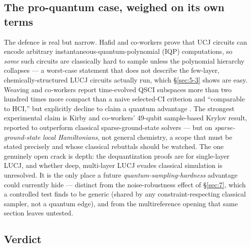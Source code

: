 \documentclass[11pt]{article}
\begin{document}
\subsection{The pro-quantum case, weighed on its own terms}\label{sec:5-4}

The defence is real but narrow. Hafid and co-workers prove that UCJ circuits can encode arbitrary instantaneous-quantum-polynomial (IQP) computations, so \emph{some} such circuits are classically hard to sample unless the polynomial hierarchy collapses \cite{hafid2025} --- a worst-case statement that does not describe the few-layer, chemically-structured LUCJ circuits actually run, which \S\ref{sec:5-3} shows are easy. Weaving and co-workers report time-evolved QSCI subspaces more than two hundred times more compact than a naive selected-CI criterion and ``comparable to HCI,'' but explicitly decline to claim a quantum advantage \cite{weaving2025}. The strongest experimental claim is Kirby and co-workers' 49-qubit sample-based Krylov result, reported to outperform classical sparse-ground-state solvers \cite{kirby2026} --- but on \emph{sparse-ground-state local Hamiltonians}, not general chemistry, a scope that must be stated precisely and whose classical rebuttals should be watched. The one genuinely open crack is depth: the dequantization proofs are for single-layer LUCJ, and whether deep, multi-layer LUCJ evades classical simulation is unresolved. It is the only place a future \emph{quantum-sampling-hardness} advantage could currently hide --- distinct from the noise-robustness effect of \S\ref{sec:7}, which a controlled test finds to be generic (shared by any constraint-respecting classical sampler, not a quantum edge), and from the multireference opening that same section leaves untested.


\subsection{Verdict}\label{sec:5-5}
\end{document}
